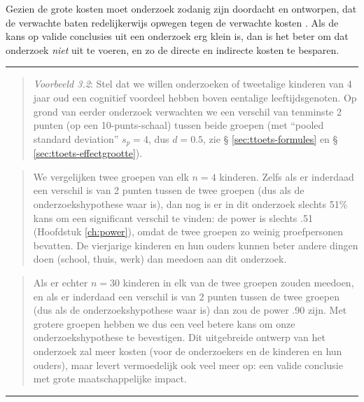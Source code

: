 \documentclass[
]{book}
\begin{document}
Gezien de grote kosten moet onderzoek zodanig zijn doordacht en
ontworpen, dat de verwachte baten redelijkerwijs opwegen tegen de
verwachte kosten \citep[Ch.3]{Rose08}. Als de kans op valide conclusies uit
een onderzoek erg klein is, dan is het beter om dat onderzoek \emph{niet} uit
te voeren, en zo de directe en indirecte kosten te besparen.

\begin{center}\rule{0.5\linewidth}{0.5pt}\end{center}

\begin{quote}
\emph{Voorbeeld 3.2}:
Stel dat we willen onderzoeken of tweetalige kinderen van 4 jaar oud een
cognitief voordeel hebben boven eentalige leeftijdsgenoten. Op grond van
eerder onderzoek verwachten we een verschil van tenminste 2 punten (op
een 10-punts-schaal) tussen beide groepen (met ``pooled standard
deviation'' \(s_p=4\), dus \(d=0.5\), zie
§ \ref{sec:ttoets-formules} en
§ \ref{sec:ttoets-effectgrootte}).
\end{quote}

\begin{quote}
We vergelijken twee groepen van
elk \(n=4\) kinderen. Zelfs als er inderdaad een verschil is van 2 punten
tussen de twee groepen (dus als de onderzoekshypothese waar is), dan nog
is er in dit onderzoek slechts 51\% kans om een significant verschil te
vinden: de power is slechts .51
(Hoofdstuk \ref{ch:power}),
omdat de twee groepen zo weinig proefpersonen
bevatten. De vierjarige kinderen en hun ouders kunnen beter andere
dingen doen (school, thuis, werk) dan meedoen aan dit onderzoek.
\end{quote}

\begin{quote}
Als er echter \(n=30\) kinderen in elk van de twee groepen zouden meedoen,
en als er inderdaad een verschil is van 2 punten tussen de twee groepen
(dus als de onderzoekshypothese waar is) dan zou de power .90 zijn. Met
grotere groepen hebben we dus een veel betere kans om onze
onderzoekshypothese te bevestigen. Dit uitgebreide ontwerp van het
onderzoek zal meer kosten (voor de onderzoekers en de kinderen en hun
ouders), maar levert vermoedelijk ook veel meer op: een valide conclusie
met grote maatschappelijke impact.
\end{quote}

\begin{center}\rule{0.5\linewidth}{0.5pt}\end{center}
\end{document}
